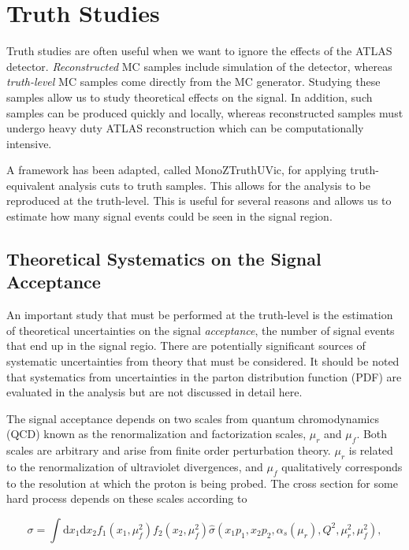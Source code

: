 \section{Truth Studies} 
\label{sec:truth}

Truth studies are often useful when we want to ignore the effects of the ATLAS detector. \textit{Reconstructed} MC samples include simulation of the detector, whereas \textit{truth-level} MC samples come directly from the MC generator. Studying these samples allow us to study theoretical effects on the signal. In addition, such samples can be produced quickly and locally, whereas reconstructed samples must undergo heavy duty ATLAS reconstruction which can be computationally intensive. 

A framework has been adapted, called MonoZTruthUVic, for applying truth-equivalent analysis cuts to truth samples. This allows for the analysis to be reproduced at the truth-level. This is useful for several reasons and allows us to estimate how many signal events could be seen in the signal region. 

\subsection{Theoretical Systematics on the Signal Acceptance}

An important study that must be performed at the truth-level is the estimation of theoretical uncertainties on the signal \textit{acceptance}, the number of signal events that end up in the signal regio. There are potentially significant sources of systematic uncertainties from theory that must be considered. It should be noted that systematics from uncertainties in the parton distribution function (PDF) are evaluated in the analysis but are not discussed in detail here. 

The signal acceptance depends on two scales from quantum chromodynamics (QCD) known as the renormalization and factorization scales, $\mu_r$ and $\mu_f$. Both scales are arbitrary and arise from finite order perturbation theory. $\mu_r$ is related to the renormalization of ultraviolet divergences, and $\mu_f$ qualitatively corresponds to the resolution at which the proton is being probed. The cross section for some hard process depends on these scales according to

\begin{equation}
\sigma = \int \text{d}x_1 \text{d}x_2 f_1(x_1, \mu_f^2) f_2 (x_2, \mu_f^2) \hat{\sigma}(x_1 p_1, x_2 p_2, \alpha_s(\mu_r), Q^2, \mu_r^2, \mu_f^2),
\end{equation}


